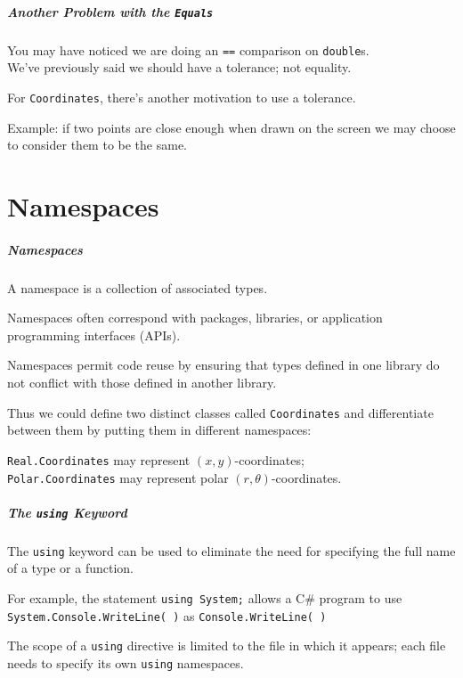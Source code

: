 \begin{frame}
\frametitle{Another Problem with the \texttt{Equals}}
You may have noticed we are doing an \texttt{==} comparison on \texttt{double}s.\\
\quad We've previously said we should have a tolerance; not equality.

For \texttt{Coordinates}, there's another motivation to use a tolerance.


Example: if two points are close enough when drawn on the screen we may choose to consider them to be the same.

\end{frame}


\part{Namespaces}
\begin{frame}\partpage\end{frame}

\begin{frame}
\frametitle{Namespaces}
A \alert{namespace} is a collection of associated types.

Namespaces often correspond with packages, libraries, or application programming interfaces (APIs).

Namespaces permit code reuse by ensuring that types defined in one library do not conflict with those defined in another library.

Thus we could define two distinct classes called \texttt{Coordinates} and differentiate between them by putting them in different namespaces:

\texttt{Real.Coordinates} may represent $(x,y)$-coordinates;\\
\texttt{Polar.Coordinates} may represent polar $(r,\theta)$-coordinates.


\end{frame}

\begin{frame}
\frametitle{The \texttt{using} Keyword}

The \texttt{using} keyword can be used to eliminate the need for specifying the full name of a type or a function.

For example, the statement \texttt{using System;} allows a C\# program to use \texttt{System.Console.WriteLine( )} as \texttt{Console.WriteLine( )}

The scope of a \texttt{using} directive is limited to the file in which it appears; each file needs to specify its own \texttt{using} namespaces.

\end{frame}

